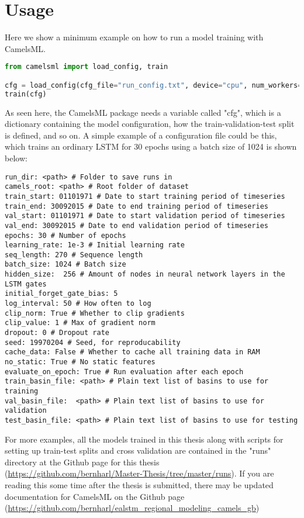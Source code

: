 \section{Usage}
Here we show a minimum example on how to run a model training with CamelsML. 
\begin{lstlisting}[language=python]
from camelsml import load_config, train

cfg = load_config(cfg_file="run_config.txt", device="cpu", num_workers=24)
train(cfg)
\end{lstlisting}
As seen here, the CamelsML package needs a variable called "cfg", which is a dictionary 
containing the model configuration, how the train-validation-test split is defined, 
and so on. 
A simple example of a configuration file could be this, which trains an ordinary 
LSTM for 30 epochs using a batch size of 1024 is shown below:
\begin{lstlisting}
run_dir: <path> # Folder to save runs in
camels_root: <path> # Root folder of dataset
train_start: 01101971 # Date to start training period of timeseries
train_end: 30092015 # Date to end training period of timeseries
val_start: 01101971 # Date to start validation period of timeseries
val_end: 30092015 # Date to end validation period of timeseries
epochs: 30 # Number of epochs
learning_rate: 1e-3 # Initial learning rate
seq_length: 270 # Sequence length
batch_size: 1024 # Batch size
hidden_size:  256 # Amount of nodes in neural network layers in the LSTM gates
initial_forget_gate_bias: 5 
log_interval: 50 # How often to log
clip_norm: True # Whether to clip gradients
clip_value: 1 # Max of gradient norm
dropout: 0 # Dropout rate
seed: 19970204 # Seed, for reproducability 
cache_data: False # Whether to cache all training data in RAM
no_static: True # No static features
evaluate_on_epoch: True # Run evaluation after each epoch
train_basin_file: <path> # Plain text list of basins to use for training 
val_basin_file:  <path> # Plain text list of basins to use for validation
test_basin_file: <path> # Plain text list of basins to use for testing
\end{lstlisting}
For more examples, all the models trained in this thesis along with scripts for 
setting up train-test splits and cross validation are contained in the "runs" directory at the 
Github page for this thesis (\url{https://github.com/bernharl/Master-Thesis/tree/master/runs}).
If you are reading this some time after the thesis is submitted, there may be updated 
documentation for CamelsML on the Github page (\url{https://github.com/bernharl/ealstm_regional_modeling_camels_gb})

